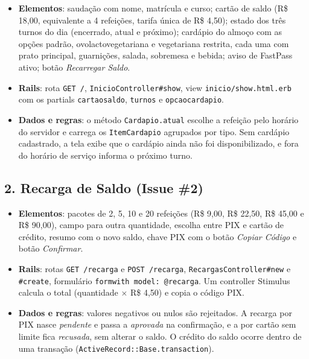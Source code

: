\documentclass[a4paper,12pt]{article}
\renewcommand{\_}{\textunderscore\allowbreak}
\begin{document}
\begin{itemize}

    \item \textbf{Elementos}: saudação com nome, matrícula e curso; cartão de saldo (R\$ 18,00, equivalente a 4 refeições, tarifa única de R\$ 4,50); estado dos três turnos do dia (encerrado, atual e próximo); cardápio do almoço com as opções padrão, ovolactovegetariana e vegetariana restrita, cada uma com prato principal, guarnições, salada, sobremesa e bebida; aviso de FastPass ativo; botão \textit{Recarregar Saldo}.

    \item \textbf{Rails}: rota \texttt{GET /}, \texttt{InicioController\#\allowbreak{}show}, view \texttt{inicio/\allowbreak{}show.\allowbreak{}html.\allowbreak{}erb} com os partials \texttt{\_cartao\_saldo}, \texttt{\_turnos} e \texttt{\_opcao\_cardapio}.

    \item \textbf{Dados e regras}: o método \texttt{Cardapio.\allowbreak{}atual} escolhe a refeição pelo horário do servidor e carrega os \texttt{ItemCardapio} agrupados por tipo. Sem cardápio cadastrado, a tela exibe que o cardápio ainda não foi disponibilizado, e fora do horário de serviço informa o próximo turno.

\end{itemize}

\subsection*{2. Recarga de Saldo (Issue \#2)}

\begin{itemize}

    \item \textbf{Elementos}: pacotes de 2, 5, 10 e 20 refeições (R\$ 9,00, R\$ 22,50, R\$ 45,00 e R\$ 90,00), campo para outra quantidade, escolha entre PIX e cartão de crédito, resumo com o novo saldo, chave PIX com o botão \textit{Copiar Código} e botão \textit{Confirmar}.

    \item \textbf{Rails}: rotas \texttt{GET /recarga} e \texttt{POST /recarga}, \texttt{RecargasController\#\allowbreak{}new} e \texttt{\#create}, formulário \texttt{form\_with model: @recarga}. Um controller Stimulus calcula o total (quantidade $\times$ R\$ 4,50) e copia o código PIX.

    \item \textbf{Dados e regras}: valores negativos ou nulos são rejeitados. A recarga por PIX nasce \textit{pendente} e passa a \textit{aprovada} na confirmação, e a por cartão sem limite fica \textit{recusada}, sem alterar o saldo. O crédito do saldo ocorre dentro de uma transação (\texttt{ActiveRecord::\allowbreak{}Base.\allowbreak{}transaction}).

\end{itemize}
\end{document}
